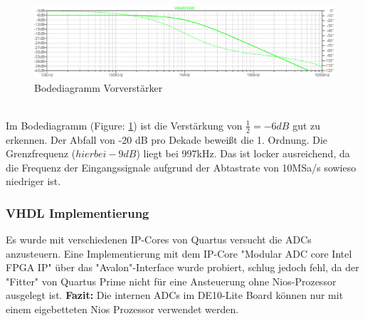 \begin{figure}[!h]
\begin{center}
\includegraphics[width=15cm]{SAUER/Grafiken/ADC_Front-End_Bode.PNG}
\caption{Bodediagramm Vorverstärker}
\label{Front-End_Bode}
\end{center}
\end{figure}
\\Im Bodediagramm (Figure: \ref{Front-End_Bode}) ist die Verstärkung von $\frac{1}{2} = -6dB$ gut zu erkennen. Der Abfall von -20 dB pro Dekade beweißt die 1. Ordnung. Die Grenzfrequenz ($hier bei -9dB$) liegt bei 997kHz. Das ist locker ausreichend, da die Frequenz der Eingangssignale aufgrund der Abtastrate von 10MSa/s sowieso niedriger ist.
\subsubsection{VHDL Implementierung}
Es wurde mit verschiedenen IP-Cores von Quartus versucht die ADCs anzusteuern.  Eine Implementierung mit dem IP-Core "Modular ADC core Intel FPGA IP" über das "Avalon"-Interface wurde probiert, schlug jedoch fehl, da der "Fitter" von Quartus Prime nicht für eine Ansteuerung ohne Nios-Prozessor ausgelegt ist.
\textbf{Fazit:} Die internen ADCs im DE10-Lite Board können nur mit einem eigebetteten Nios Prozessor verwendet werden.